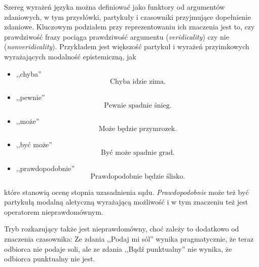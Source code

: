 \documentclass[a4paper, 12pt]{article}
\theoremstyle{remark}
\begin{document}
Szereg wyrażeń języka można definiować jako funktory od argumentów zdaniowych, w tym przysłówki, partykuły i czasowniki przyjmujące dopełnienie zdaniowe. Kluczowym podziałem przy reprezentowaniu ich znaczenia jest to, czy prawdziwość frazy pociąga prawdziwość argumentu (\emph{veridicality}) czy nie (\emph{nonveridicality}).
Przykładem jest większość partykuł i wyrażeń przyimkowych wyrażających modalność epistemiczną, jak
\begin{itemize}
\item ,,chyba''
\begin{equation}
	\text{Chyba idzie zima.}
\end{equation}
\item ,,pewnie''
\begin{equation}
	\text{Pewnie spadnie śnieg.}
\end{equation}
\item ,,może''
\begin{equation}
	\text{Może będzie przymrozek.}
\end{equation}
\item ,,być może''
\begin{equation}
	\text{Być może spadnie grad.}
\end{equation}
\item ,,prawdopodobnie''
\begin{equation}
	\text{Prawdopodobnie będzie ślisko.}
\end{equation}
\end{itemize}
które stanowią ocenę stopnia uzasadnienia sądu. \emph{Prawdopodobnie} może też być partykułą modalną aletyczną wyrażającą możliwość i w tym znaczeniu też jest operatorem nieprawdomównym.

Tryb rozkazujący także jest nieprawdomówny, choć zależy to dodatkowo od znaczenia czasownika: Ze zdania ,,Podaj mi sól'' wynika pragmatycznie, że teraz odbiorca nie podaje soli, ale ze zdania ,,Bądź punktualny'' nie wynika, że odbiorca punktualny nie jest.
\end{document}
